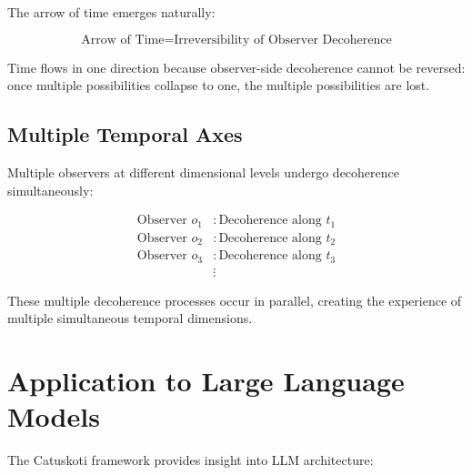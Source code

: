 \documentclass[12pt,a4paper]{article}
\begin{document}
The arrow of time emerges naturally:

\begin{equation}
\text{Arrow of Time} = \text{Irreversibility of Observer Decoherence}
\end{equation}

Time flows in one direction because observer-side decoherence cannot be reversed: once multiple possibilities collapse to one, the multiple possibilities are lost.

\subsection{Multiple Temporal Axes}

Multiple observers at different dimensional levels undergo decoherence simultaneously:

\begin{equation}
\begin{aligned}
\text{Observer } o_1 &: \text{Decoherence along } t_1 \\
\text{Observer } o_2 &: \text{Decoherence along } t_2 \\
\text{Observer } o_3 &: \text{Decoherence along } t_3 \\
&\vdots
\end{aligned}
\end{equation}

These multiple decoherence processes occur in parallel, creating the experience of multiple simultaneous temporal dimensions.

\section{Application to Large Language Models}

The Catuskoti framework provides insight into LLM architecture:
\end{document}
